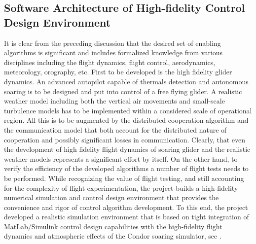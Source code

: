 \documentclass[letterpaper, 10 pt, conference]{ieeeconf}  %
\begin{document}
\subsection{Software Architecture of High-fidelity Control Design Environment}
It is clear from the preceding discussion that the desired set of enabling algorithms is significant and includes formalized knowledge from various disciplines including the flight dynamics, flight control, aerodynamics, meteorology, orography, etc. First to be developed is the high fidelity glider dynamics. An advanced autopilot capable of thermals detection and autonomous soaring is to be designed and put into control of a free flying glider. A realistic weather model including both the vertical air movements and small-scale turbulence models has to be implemented within a considered scale of operational region. All this is to be augmented by the distributed cooperation algorithm and the communication model that both account for the distributed nature of cooperation and possibly significant losses in communication. Clearly, that even the development of high fidelity flight dynamics of soaring glider and the realistic weather models represents a significant effort by itself. On the other hand, to verify the efficiency of the developed algorithms a number of flight tests needs to be performed. While recognizing the value of flight testing, and still accounting for the complexity of flight experimentation, the project builds a high-fidelity numerical simulation and control design environment that provides the convenience and rigor of control algorithm development. To this end, the project developed a realistic simulation environment that is based on tight integration of MatLab/Simulink \cite{MATLAB:2013} control design capabilities with the high-fidelity flight dynamics and atmospheric effects of the Condor soaring simulator, see \cite{Condor:2013:Online}.
\end{document}
